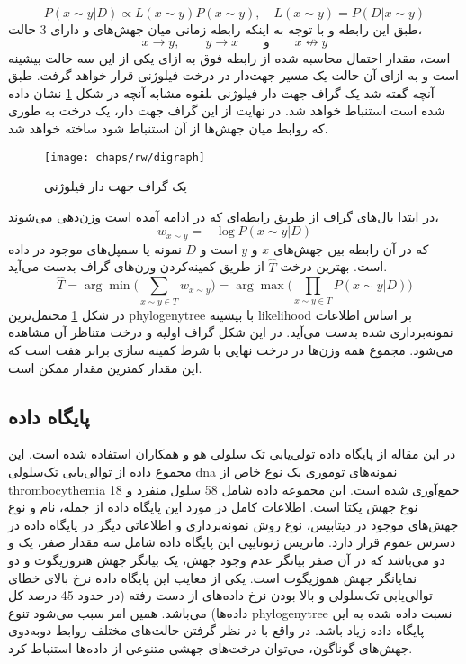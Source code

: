 \begin{equation}
	P(x\sim y | D) \propto L(x\sim y)P(x\sim y), \quad L(x\sim y) = P(D|x\sim y)
\end{equation}
طبق این رابطه و با توجه به اینکه رابطه‌ زمانی میان جهش‌های  و  دارای 3 حالت،
\begin{equation*}
	x \rightarrow y, \qquad y \rightarrow x \qquad \text{و} \qquad x \not\leftrightarrow y
\end{equation*}
است، مقدار احتمال محاسبه شده از رابطه فوق به ازای یکی از این سه حالت بیشینه است و به ازای آن حالت یک مسیر جهت‌دار در درخت فیلوژنی قرار خواهد گرفت. طبق آنچه گفته شد یک گراف جهت دار فیلوژنی بلقوه مشابه آنچه در شکل \ref{fig:ch_rw:digraph} نشان داده ‌شده است استنباط خواهد شد. در نهایت از این گراف جهت دار، یک درخت به طوری که روابط میان جهش‌ها از آن استنباط شود ساخته خواهد شد. 
\begin{figure}[!ht]
	\centerline{\texttt{[image: chaps/rw/digraph]}}
	\caption{یک گراف جهت دار فیلوژنی}
	\label{fig:ch_rw:digraph}
\end{figure}
در ابتدا یال‌های گراف از طریق رابطه‌ای که در ادامه آمده است وزن‌دهی می‌شوند،
\begin{equation}
	w_{x\sim y} = -\log P(x\sim y| D)
\end{equation}
که در آن  رابطه بین جهش‌های $x$ و $y$ است و $D$ نمونه یا سمپل‌های موجود در داده است. بهترین درخت $\hat{T}$ از طریق کمینه‌کردن وزن‌های گراف بدست می‌آید.
\begin{equation}
	\hat{T} = \arg \min\Big( \sum_{x\sim y \in T} w_{x\sim y} \Big)= \arg \max \Big( \prod_{x\sim y \in T} P(x\sim y | D) \Big )
\end{equation}
در شکل \ref{fig:ch_rw:digraph} محتمل‌ترین \gls{phylogenytree} با بیشینه \gls{likelihood} بر اساس اطلاعات نمونه‌برداری شده بدست می‌آید. در این شکل گراف اولیه و درخت متناظر آن مشاهده می‌شود. مجموع همه وزن‌ها در درخت نهایی با شرط کمینه سازی برابر هفت است که این مقدار کمترین مقدار ممکن است. 
\subsection{پایگاه داده}
در این مقاله از پایگاه داده تولی‌یابی تک سلولی هو‌ و همکاران \cite{hou2012single} استفاده شده است. این مجموع داده از توالی‌یابی تک‌سلولی \gls{dna} نمونه‌های توموری یک نوع خاص از \gls{thrombocythemia} جمع‌آوری شده است. این مجموعه داده شامل 58 سلول منفرد و 18 نوع جهش یکتا است. اطلاعات کامل در مورد این پایگاه داده از جمله، نام و نوع جهش‌های موجود در دیتابیس، نوع روش نمونه‌برداری و اطلاعاتی دیگر در پایگاه داده  در دسرس عموم قرار دارد. ماتریس ژنوتایپی این پایگاه داده شامل سه مقدار صفر، یک و دو می‌باشد که در آن صفر بیانگر عدم وجود جهش، یک بیانگر جهش هتروزیگوت و دو نمایانگر جهش هموزیگوت است. یکی از معایب این پایگاه داده نرخ بالای خطای توالی‌یابی تک‌سلولی و بالا‌ بودن نرخ داده‌های از دست رفته (در حدود 45 درصد کل داده‌ها) می‌باشد. همین امر سبب می‌شود تنوع \gls{phylogenytree} نسبت داده شده به این پایگاه داده زیاد باشد. در واقع با در نظر گرفتن حالت‌های مختلف روابط دو‌به‌دوی جهش‌های گوناگون، می‌توان درخت‌های جهشی متنوعی از داده‌ها استنباط کرد. 

